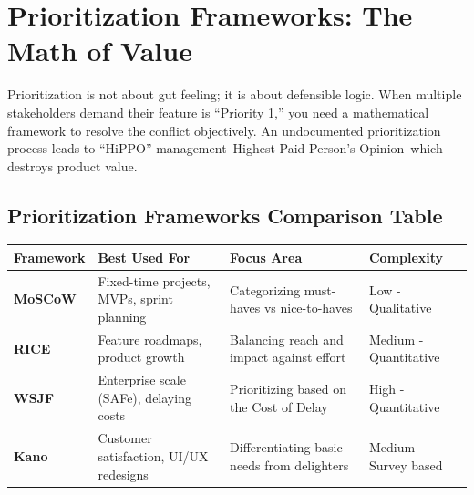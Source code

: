 \documentclass[
  11pt,
  openany,
  oneside]{book}
\begin{document}
\section{Prioritization Frameworks: The Math of
Value}\label{prioritization-frameworks-the-math-of-value}

Prioritization is not about gut feeling; it is about defensible logic.
When multiple stakeholders demand their feature is ``Priority 1,'' you
need a mathematical framework to resolve the conflict objectively. An
undocumented prioritization process leads to ``HiPPO''
management--Highest Paid Person's Opinion--which destroys product value.

\subsection{Prioritization Frameworks Comparison
Table}\label{prioritization-frameworks-comparison-table}

\begin{longtable}[]{@{}
  >{\raggedright\arraybackslash}p{}
  >{\raggedright\arraybackslash}p{}
  >{\raggedright\arraybackslash}p{}
  >{\raggedright\arraybackslash}p{}@{}}
\toprule\noalign{}
\begin{minipage}[b]{\linewidth}\raggedright
Framework
\end{minipage} & \begin{minipage}[b]{\linewidth}\raggedright
Best Used For
\end{minipage} & \begin{minipage}[b]{\linewidth}\raggedright
Focus Area
\end{minipage} & \begin{minipage}[b]{\linewidth}\raggedright
Complexity
\end{minipage} \\
\midrule\noalign{}
\endhead
\bottomrule\noalign{}
\endlastfoot
\textbf{MoSCoW} & Fixed-time projects, MVPs, sprint planning &
Categorizing must-haves vs nice-to-haves & Low - Qualitative \\
\textbf{RICE} & Feature roadmaps, product growth & Balancing reach and
impact against effort & Medium - Quantitative \\
\textbf{WSJF} & Enterprise scale (SAFe), delaying costs & Prioritizing
based on the Cost of Delay & High - Quantitative \\
\textbf{Kano} & Customer satisfaction, UI/UX redesigns & Differentiating
basic needs from delighters & Medium - Survey based \\
\end{longtable}
\end{document}
